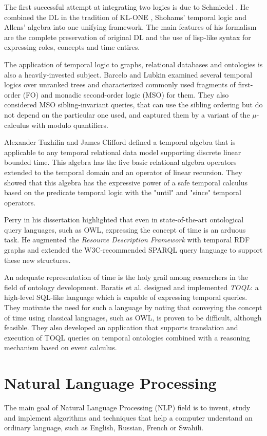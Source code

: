 The first successful attempt at integrating two logics is due to Schmiedel \cite{schmiedel}. He combined the DL in the tradition
of KL-ONE \cite{klone}, Shohams' \cite{shoh} temporal logic and Allens' \cite{allen} algebra into one unifying framework. The main
features of his formalism are the complete preservation of original DL and the use of lisp-like syntax for expressing roles,
concepts and time entires.

The application of temporal logic to graphs, relational databases and ontologies is also a heavily-invested subject.
Barcelo and Lubkin examined \cite{barcelo} several temporal logics over unranked trees and characterized commonly used fragments of
first-order (FO) and monadic second-order logic (MSO) for them. They also considered MSO sibling-invariant queries, that can use the
sibling ordering but do not depend on the particular one used, and captured them by a variant of the $\mu$-calculus with modulo
quantifiers.

Alexander Tuzhilin and James Clifford defined \cite{clif} a temporal algebra that is applicable to any temporal relational data
model supporting discrete linear bounded time. This algebra has the five basic relational algebra operators extended to the
temporal domain and an operator of linear recursion. They showed that this algebra has the expressive power of a safe temporal
calculus based on the predicate temporal logic with the "until" and "since" temporal operators.

Perry in his dissertation \cite{perry} highlighted that even in state-of-the-art ontological query languages, such as OWL,
expressing the concept of time is an arduous task. He augmented the \textit{Resource Description Framework} with temporal RDF
graphs and extended the W3C-recommended SPARQL query language to support these new structures.

An adequate representation of time is the holy grail among researchers in the field of ontology development.  Baratis et al.
\cite{toql} designed and implemented \textit{TOQL}: a high-level SQL-like language which is capable of expressing temporal
queries. They motivate the need for such a language by noting that conveying the concept of time using classical languages, such
as OWL, is proven to be difficult, although feasible. They also developed an application that supports translation and execution
of TOQL queries on temporal ontologies combined with a reasoning mechanism based on event calculus.

\section{Natural Language Processing}
The main goal of Natural Language Processing (NLP) field is to invent, study and implement algorithms and techniques that help a
computer understand an ordinary language, such as English, Russian, French or Swahili.

